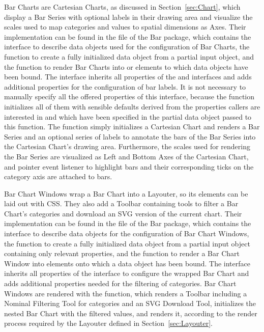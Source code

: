 Bar Charts are Cartesian Charts, as discussed in
Section~\ref{sec:Chart}, which display a Bar Series with optional
labels in their drawing area and visualize the scales used to map
categories and values to spatial dimensions as Axes. Their
implementation can be found in the  file of the Bar
package, which contains the  interface to describe data
objects used for the configuration of Bar Charts, the
 function to create a fully initialized
 data object from a partial input object, and the
 function to render Bar Charts into
 or  elements to which  data
objects have been bound. The  interface inherits all
properties of the  and 
interfaces and adds additional properties for the configuration of bar
labels. It is not necessary to manually specify all the offered
properties of this interface, because the  function
initializes all of them with sensible defaults derived from the
properties callers are interested in and which have been specified in
the partial data object passed to this function. The
 function simply initializes a Cartesian Chart
and renders a Bar Series and an optional series of labels to annotate
the bars of the Bar Series into the Cartesian Chart's drawing area.
Furthermore, the scales used for rendering the Bar Series are
visualized as Left and Bottom Axes of the Cartesian Chart, and pointer
event listener to highlight bars and their corresponding ticks on the
category axis are attached to bars.

Bar Chart Windows wrap a Bar Chart into a Layouter, so its elements
can be laid out with CSS. They also add a Toolbar containing tools to
filter a Bar Chart's categories and download an SVG version of the
current chart. Their implementation can be found in the
 file of the Bar package, which contains the
 interface to describe data objects for the
configuration of Bar Chart Windows, the 
function to create a fully initialized  data
object from a partial input object containing only relevant
properties, and the  function to render a
Bar Chart Window into  elements onto which a
 data object has been bound. The
 interface inherits all properties of the
 interface to configure the wrapped Bar Chart and adds
additional properties needed for the filtering of categories. Bar
Chart Windows are rendered with the 
function, which renders a Toolbar including a Nominal Filtering Tool
for categories and an SVG Download Tool, initializes the nested Bar
Chart with the filtered values, and renders it, according to the
render process required by the Layouter defined in
Section~\ref{sec:Layouter}.


